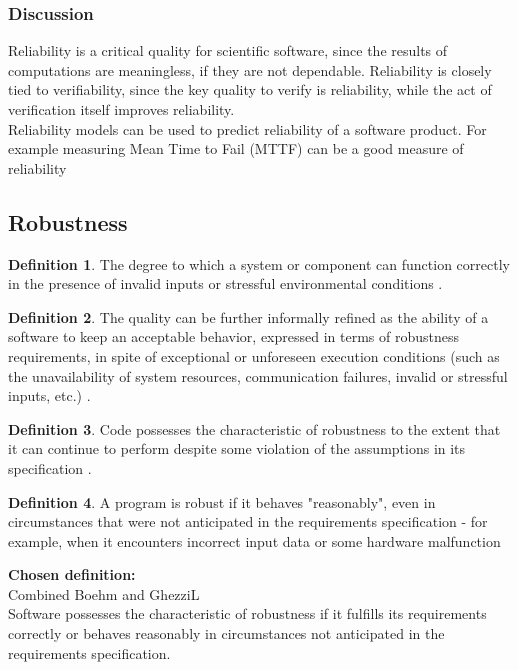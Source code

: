 \documentclass[letterpaper,cleveref]{lipics-v2019}
\theoremstyle{definition}
\newtheorem{defn}{Definition}
\begin{document}
\subsubsection{Discussion}
Reliability is a critical quality for scientific software, since the results of
computations are meaningless, if they are not dependable.  Reliability is
closely tied to verifiability, since the key quality to verify is reliability,
while the act of verification itself improves reliability.\\
Reliability models can be used to predict reliability of a software product. For example measuring Mean Time to Fail (MTTF) can be a good measure of reliability \cite{berander2005software}

\subsection{Robustness}
\begin{defn}
The degree to which a system or component can function correctly in the presence of invalid inputs or stressful environmental conditions \cite{IEEEStdGlossarySET1990}.\\
\end{defn}
\begin{defn}
The quality can be further informally refined as the ability of a software to keep an acceptable behavior, expressed in terms of robustness requirements, in spite of exceptional or unforeseen execution conditions (such as the unavailability of system resources, communication failures, invalid or stressful inputs, etc.) \cite{fernandez2005model}.\\
\end{defn}
\begin{defn}
Code possesses the characteristic of robustness to the extent that it can continue to perform despite some violation of the assumptions in its specification \cite{boehm2007software}.
\end{defn}
\begin{defn}
A program is robust if it behaves "reasonably", even in circumstances that were not anticipated in the requirements specification - for example, when it encounters incorrect input data or some hardware malfunction \cite{ghezzi1991fundamentals}\\
\end{defn}

\textbf{Chosen definition:}\\
Combined Boehm and GhezziL\\
Software possesses the characteristic of robustness if it fulfills its requirements correctly or behaves reasonably in circumstances not anticipated in the requirements specification.\\
\end{document}
